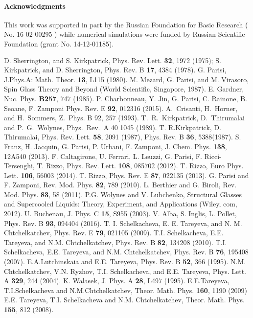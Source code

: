 \documentclass{jetpl}
\begin{document}
\paragraph*{Acknowledgments}
This work was supported in part by the Russian Foundation for Basic Research ( No. 16-02-00295 ) while numerical simulations were funded by Russian Scientific Foundation (grant No. 14-12-01185).


%
\begin{thebibliography}{99}
  D. Sherrington, and S. Kirkpatrick, {Phys. Rev. Lett.} {\bf 32},  1972 (1975);  S. Kirkpatrick, and D. Sherrington, {Phys.
Rev. B} {\bf 17}, 4384 (1978).
  G. Parisi, { J.Phys.A: Math. Theor.} {\bf13}, L115 (1980).
  M. Mezard, G. Parisi, and M. Virasoro, Spin Glass Theory and Beyond (World Scientific, Singapore, 1987).
  E. Gardner,  Nuc. Phys. {\bf B257}, 747 (1985).
  P. Charbonneau, Y. Jin, G. Parisi, C. Rainone, B. Seoane, F. Zamponi
 Phys. Rev. E \textbf{92}, 012316 (2015).
A.~Crisanti, H.~Horner, and H.~Sommers, Z.~Phys. B 92, 257 (1993).
T.~R.~Kirkpatrick, D.~Thirumalai and P.~G.~Wolynes, Phys.~Rev.~A 40 1045 (1989).
T. R.Kirkpatrick, D. Thirumalai, Phys. Rev. Lett. \textbf{58}, 2091 (1987), Phys. Rev. B \textbf{36}, 5388(1987).
S. Franz, H. Jacquin, G. Parisi, P. Urbani, F. Zamponi, J. Chem. Phys. \textbf{138}, 12A540 (2013).
  F. Caltagirone, U. Ferrari, L. Leuzzi, G. Parisi, F. Ricci-Tersenghi, T. Rizzo, Phys. Rev. Lett. \textbf{108}, 085702 (2012).
 T. Rizzo, Euro Phys. Lett. \textbf{106}, 56003 (2014).
 T. Rizzo, Phys. Rev. E \textbf{87}, 022135 (2013).
 G. Parisi and F. Zamponi, Rev. Mod. Phys. \textbf{82}, 789 (2010).
 L. Berthier and G. Biroli, Rev. Mod. Phys. \textbf{83}, 58 (2011).
 P.G. Wolynes and V. Lubchenko, Structural Glasses and Supercooled Liquids: Theory,
Experiment, and Applications (Wiley, com, 2012).
U. Buchenau, J. Phys. C \textbf{15}, S955 (2003).
V. Alba, S. Inglis, L. Pollet, Phys. Rev. B \textbf{93}, 094404 (2016).
  T. I. Schelkacheva, E. E. Tareyeva, and N. M.
Chtchelkatchev, Phys. Rev. E \textbf{79}, 021105 (2009).
  T.I. Schelkacheva, E.E. Tareyeva, and N.M. Chtchelkatchev, Phys. Rev. B {\bf 82}, 134208 (2010).
 T.I. Schelkacheva, E.E. Tareyeva, and N.M. Chtchelkatchev, Phys. Rev. B {\bf 76}, 195408 (2007).
E.A.Lutchinskaia and E.E. Tareyeva, {Phys. Rev. B} {\bf 52}, 366 (1995).
N.M. Chtchelkatchev, V.N. Ryzhov, T.I. Schelkacheva, and E.E. Tareyeva, Phys. Lett. A
\textbf{329}, 244 (2004).
 K. Walasek, J. Phys. A \textbf{28}, L497 (1995).
 E.E.Tareyeva, T.I.Schelkacheva and  N.M.Chtchelkatchev, Theor. Math. Phys. \textbf{160}, 1190 (2009)
 E.E. Tareyeva, T.I. Schelkacheva and  N.M. Chtchelkatchev, Theor. Math. Phys. {\bf{155}}, 812 (2008).


\end{thebibliography}
\end{document}
